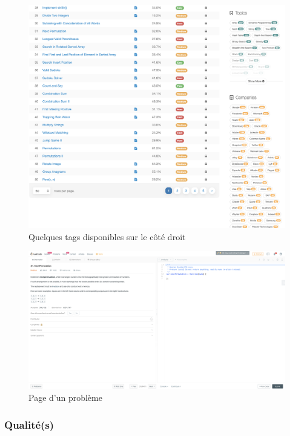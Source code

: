\begin{figure}[H]
    \includegraphics[width=\textwidth,height=0.6\textheight,keepaspectratio]{images/comparison/leetcode-2.png}
    \centering
    \caption[Leetcode : quelques \glspl{tag} disponibles sur le côté droit]{Quelques \glspl{tag} disponibles sur le côté droit}
\end{figure}

\begin{figure}[H]
    \includegraphics[width=\textwidth,height=0.35\textheight,keepaspectratio]{images/comparison/leetcode-3.png}
    \centering
    \caption[Leetcode : page d'un problème]{Page d'un problème}
\end{figure}

\subsubsection*{Qualité(s)}


